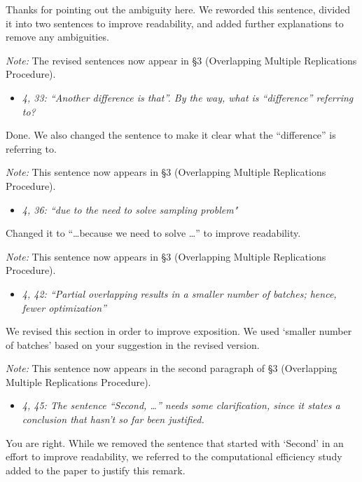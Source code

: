 \documentclass[11pt,notitlepage,onecolumn]{article}
\newcommand{\noi}{\noindent}
\begin{document}
\noi
Thanks for pointing out the ambiguity here. 
We reworded this sentence, divided it into two sentences to improve readability, and added further explanations to remove any ambiguities. 
\bigskip 

\noi
{\it Note:}
The revised sentences now appear in \S 3 (Overlapping Multiple Replications Procedure). 
\medskip 

\begin{itemize}
\item[] \textit{4, 33: ``Another difference is that''. By the way, what is ``difference'' referring to?}
\end{itemize}

\noi
Done.
We also changed the sentence to make it clear what the ``difference'' is referring to. 
\medskip 

\noi
{\it Note:}
This sentence now appears in \S 3 (Overlapping Multiple Replications Procedure). 
\medskip 

\begin{itemize}
\item[] \textit{4, 36: ``due to the need to solve sampling problem"}
\end{itemize}

\noi
Changed it to ``\dots because we need to solve \ldots '' to improve readability.  
\medskip 

\noi
{\it Note:}
This sentence now appears in \S 3 (Overlapping Multiple Replications Procedure). 
\medskip 

\begin{itemize}
\item[] \textit{4, 42: ``Partial overlapping results in a smaller number of batches; hence, fewer optimization''}
\end{itemize}

\noi
We revised this section in order to improve exposition. 
We used `smaller number of batches' based on your suggestion in the revised version. 
\medskip 

\noi 
{\it Note:} This sentence now appears in the second paragraph of \S 3 (Overlapping Multiple Replications Procedure). 
\medskip 


\begin{itemize}
\item[] \textit{4, 45: The sentence ``Second, \ldots '' needs some clarification, since it states a conclusion that hasn't so far been justified.}
\end{itemize}

\noi
You are right. 
While we removed the sentence that started with `Second' in an effort to improve readability, we referred to the computational efficiency study added to the paper to justify this remark.   
\medskip 
\end{document}
